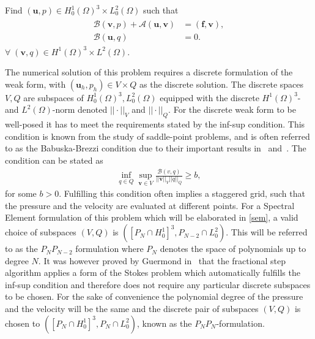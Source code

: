 Find $(\mathbf{u}, p) \in H^1_0(\Omega)^3\times L^2_0(\Omega)$ such that 
\begin{align}
    \begin{split}
           \mathcal{B}(\mathbf{v},p) 
         +\mathcal{A}(\mathbf{u},\mathbf{v}) &= (\mathbf{f},\mathbf{v}), \\
        \mathcal{B}(\mathbf{u},q) &= 0.
    \end{split}
	\label{eq:NSweak}
\end{align}
$\forall\; (\mathbf{v}, q) \in H^1(\Omega)^3\times L^2(\Omega)$.
%

The numerical solution of this problem requires a discrete formulation of the weak form, with $(\mathbf{u}_h,p_h)\in V\times Q$
as the discrete solution. The discrete spaces $V,Q$ are subspaces of $ H_0^1(\Omega)^{3},L^2_0(\Omega)$ equipped with the discrete
$ H^1(\Omega) ^3$- and $L^2(\Omega)$-norm denoted $||\cdot||_V$ and $||\cdot||_Q$. 
For the discrete weak form to be well-posed it has to meet the requirements stated by the
inf-sup condition. This condition is known from the study of saddle-point problems, and 
is often referred to as the Babuska-Brezzi condition due to their important results
in~\cite{Babuska} and~\cite{Brezzi}. The condition can be stated as
%
\begin{align}
    \inf_{q\in Q}\sup_{\mathbf{v}\in V}\frac{\mathcal{B}(v,q)}{||\mathbf{v}||_V||q||_Q} \ge b,
    \label{eq:infsup}
\end{align}
%
for some $b>0$. Fulfilling this condition often implies
a staggered grid, such that the pressure and the velocity are evaluated at different points. 
For a Spectral Element formulation of this problem which will be elaborated in \cref{sem},
a valid choice of subspaces $(V,Q)$ is $\left(  \left[  P_N\cap H^1_0\right]^3,P_{N-2} \cap L^{2}_{0}\right)$. This will be referred to as the 
$P_NP_{N-2}$ formulation where $P_N$ denotes the space of polynomials up to degree $N$.
It was however proved by Guermond in~\cite{GuermondPnPn} that the fractional step algorithm applies a 
form of the Stokes problem which automatically fulfills the inf-sup condition and therefore does not require any particular 
discrete subspaces to be chosen. For the sake of convenience the polynomial degree of the pressure and the velocity will be 
the same and the discrete pair of subspaces $(V,Q)$ is chosen to $(\left[ P_N\cap H^1_0 \right]^3,P_{N} \cap L^{2}_{0})$,
known as the $P_NP_N$-formulation.

